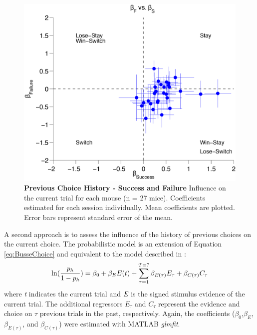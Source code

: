 \begin{figure}
  \centering
  	\includegraphics[width=\textwidth]{Figures/chapter2/history_failure_success_model_error_bars.png}
  \caption[Previous Choice History - Success and Failure]{\textbf{Previous Choice History - Success and Failure} Influence on the current trial for each mouse (n = 27 mice). Coefficients estimated for each session individually. Mean coefficients are plotted. Error bars represent standard error of the mean.}
   \label{fig:failsuccesshist}
\end{figure}
A second approach is to assess the influence of the history of previous choices on the current choice. The probabilistic model is an extension of Equation \ref{eq:BusseChoice} and equivalent to the model described in \textcite{Frund2014}:
\begin{equation}
	\centering
	\ln(\frac{p_h}{1-p_h}) = \beta_0 + \beta_E E(t) + \sum_{\tau = 1}^{T=7} \beta_{E(\tau)} E_\tau + \beta_{C(\tau)} C_\tau
\end{equation}
where \emph{t} indicates the current trial and  $\emph{E}$ is the signed stimulus evidence of the current trial. The additional regressors $E_\tau$ and $C_\tau$ represent the evidence and choice on $\tau$ previous trials in the past, respectively. Again, the coefficients ($\beta_0$,$\beta_E$,$\beta_{E(\tau)}$, and $\beta_{C(\tau)}$) were estimated with MATLAB \emph{glmfit}.\par 
